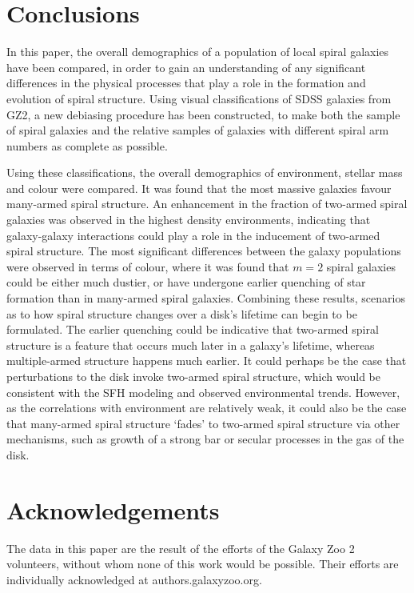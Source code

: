 \documentclass[useAMS,usenatbib]{mn2e}
\begin{document}
\section{Conclusions}
\label{sec:conclusions}

In this paper, the overall demographics of a population of local spiral galaxies have been compared, in order to gain an understanding of any significant differences in the physical processes that play a role in the formation and evolution of spiral structure. Using visual classifications of SDSS galaxies from GZ2, a new debiasing procedure has been constructed, to make both the sample of spiral galaxies and the relative samples of galaxies with different spiral arm numbers as complete as possible.

Using these classifications, the overall demographics of environment, stellar mass and colour were compared. It was found that the most massive galaxies favour many-armed spiral structure. An enhancement in the fraction of two-armed spiral galaxies was observed in the highest density environments, indicating that galaxy-galaxy interactions could play a role in the inducement of two-armed spiral structure. The most significant differences between the galaxy populations were observed in terms of colour, where it was found that $m=2$ spiral galaxies could be either much dustier, or have undergone earlier quenching of star formation than in many-armed spiral galaxies. Combining these results, scenarios as to how spiral structure changes over a disk's lifetime can begin to be formulated. The earlier quenching could be indicative that two-armed spiral structure is a feature that occurs much later in a galaxy's lifetime, whereas multiple-armed structure happens much earlier. It could perhaps be the case that perturbations to the disk invoke two-armed spiral structure, which would be consistent with the SFH modeling and observed environmental trends. However, as the correlations with environment are relatively weak, it could also be the case that many-armed spiral structure `fades' to two-armed spiral structure via other mechanisms, such as growth of a strong bar or secular processes in the gas of the disk.


\section{Acknowledgements}

The data in this paper are the result of the efforts of the Galaxy Zoo 2 volunteers, without whom none of this work would be possible. Their efforts are individually acknowledged at authors.galaxyzoo.org.



\end{document}
